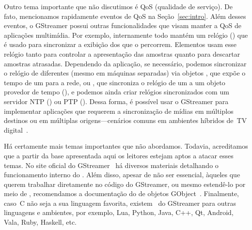 \documentclass{SBCbookchapter}
\begin{document}
Outro tema importante que não discutimos é QoS (qualidade de serviço).  De
fato, mencionamos rapidamente eventos de QoS na Seção~\ref{sec:intro}.  Além
desses eventos, o GStreamer possui outras funcionalidades que visam manter a
QoS de aplicações multimídia.  Por exemplo, internamente todo 
mantém um relógio () que é usado para sincronizar a exibição dos
 que o percorrem.  Elementos  usam esse relógio tanto
para controlar a apresentação das amostras quanto para descartar amostras
atrasadas.  Dependendo da aplicação, se necessário, podemos sincronizar o
relógio de  diferentes (mesmo em máquinas separadas) via
objetos , que expõe o tempo de um  para a
rede, ou , que sincroniza o relógio de um 
a um objeto provedor de tempo (), e podemos ainda
criar relógios sincronizados com um servidor NTP () ou PTP
().  Dessa forma, é possível usar o GStreamer para
implementar aplicações que requerem a sincronização de mídias em múltiplos
destinos ou em múltiplas origens---cenários comuns em ambientes híbridos
de~TV digital~\cite{Cesar-2016}.

Há certamente mais temas importantes que não abordamos.  Todavia,
acreditamos que a partir da base apresentada aqui os leitores estejam aptos
a atacar esses temas.  No site oficial do GStreamer~\cite{gstreamer} há
diversos materiais detalhando o funcionamento interno do .
Além disso, apesar de não ser essencial, àqueles que querem trabalhar
diretamente no código do GStreamer, ou mesmo estendê-lo por meio de
, recomendamos a documentação do  de objetos
GObject~\cite{glib}.  Finalmente, caso~C não seja a sua linguagem favorita,
existem~ do GStreamer para outras linguagens e ambientes, por
exemplo, Lua, Python, Java, C++, Qt, Android, Vala, Ruby, Haskell, etc.




\end{document}
